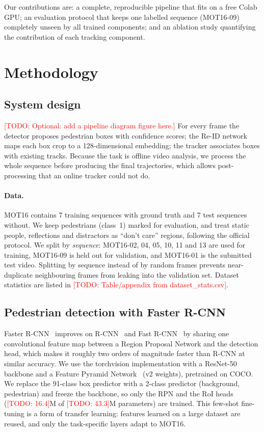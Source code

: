 \documentclass[11pt,letterpaper]{article}
\newcommand{\todo}[1]{\textcolor{red}{[TODO: #1]}}
\begin{document}
Our contributions are: a complete, reproducible pipeline that fits on a free Colab GPU; an evaluation protocol that keeps one labelled sequence (MOT16-09) completely unseen by all trained components; and an ablation study quantifying the contribution of each tracking component.

\section{Methodology}
\subsection{System design}
\todo{Optional: add a pipeline diagram figure here.} For every frame the detector proposes pedestrian boxes with confidence scores; the Re-ID network maps each box crop to a 128-dimensional embedding; the tracker associates boxes with existing tracks. Because the task is offline video analysis, we process the whole sequence before producing the final trajectories, which allows post-processing that an online tracker could not do.

\paragraph{Data.} MOT16 contains 7 training sequences with ground truth and 7 test sequences without. We keep pedestrians (class~1) marked for evaluation, and treat static people, reflections and distractors as ``don't care'' regions, following the official protocol. We split by \emph{sequence}: MOT16-02, 04, 05, 10, 11 and 13 are used for training, MOT16-09 is held out for validation, and MOT16-01 is the submitted test video. Splitting by sequence instead of by random frames prevents near-duplicate neighbouring frames from leaking into the validation set. Dataset statistics are listed in \todo{Table/appendix from dataset\_stats.csv}.

\subsection{Pedestrian detection with Faster R-CNN}
Faster R-CNN~\cite{ren2015faster} improves on R-CNN~\cite{girshick2014rcnn} and Fast R-CNN~\cite{girshick2015fast} by sharing one convolutional feature map between a Region Proposal Network and the detection head, which makes it roughly two orders of magnitude faster than R-CNN at similar accuracy. We use the torchvision implementation with a ResNet-50~\cite{he2016resnet} backbone and a Feature Pyramid Network~\cite{lin2017fpn} (v2 weights), pretrained on COCO. We replace the 91-class box predictor with a 2-class predictor (background, pedestrian) and freeze the backbone, so only the RPN and the RoI heads (\todo{16.4}M of \todo{43.3}M parameters) are trained. This few-shot fine-tuning is a form of transfer learning: features learned on a large dataset are reused, and only the task-specific layers adapt to MOT16.
\end{document}
